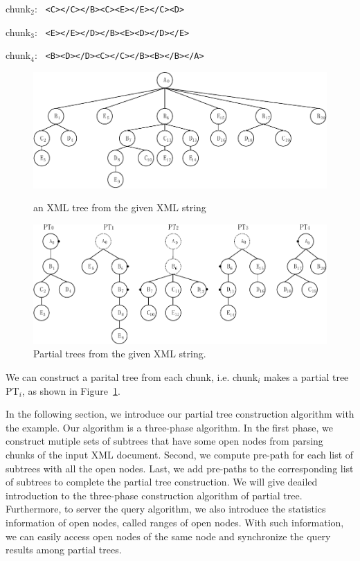  chunk$_2$: \texttt{ <C></C></B><C><E></E></C><D>}

 chunk$_3$: \texttt{ <E></E></D></B><E><D></D></E>}

 chunk$_4$: \texttt{ <B><D></D><C></C></B><B></B></A> }


\begin{figure}[t]
	\centering\includegraphics[scale=.9]{partialtree/figures/fromWord-5.pdf}
	\caption{an XML tree from the given XML string}
	\label{fig:tree}
	
	\centering\includegraphics[scale=.9]{partialtree/figures/fromWord-7.pdf}
	\caption{Partial trees from the given XML string.}
	\label{fig:partialtree2}
\end{figure}

We can construct a parital tree from each chunk, i.e. chunk$_i$ makes a partial
tree PT$_i$, as shown in Figure~\ref{fig:partialtree2}.

In the following section, we introduce our partial tree construction algorithm
with the example. Our algorithm is a three-phase algorithm. In the first phase,
we construct mutiple sets of subtrees that have some open nodes from parsing
chunks of the input XML document. Second, we compute pre-path for each list of
subtrees with all the open nodes. Last, we add pre-paths to the corresponding
list of subtrees to complete the partial tree construction. We will give deailed
introduction to the three-phase construction algorithm of partial tree.
Furthermore, to server the query algorithm, we also introduce the statistics
information of open nodes, called ranges of open nodes. With such information,
we can easily access open nodes of the same node and synchronize the query
results among partial trees.

